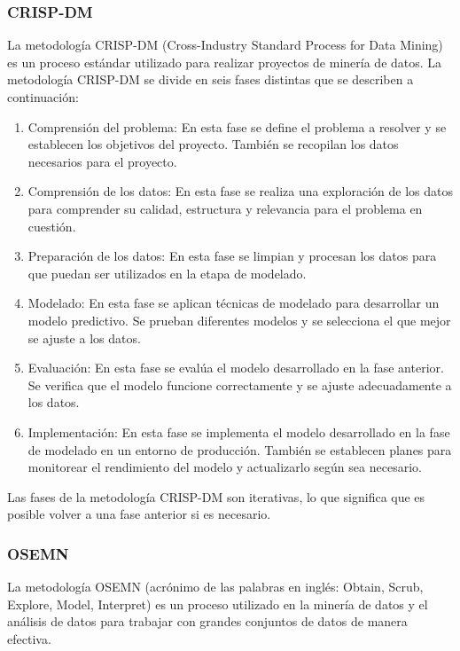 \subsubsection{CRISP-DM}
La metodología CRISP-DM (Cross-Industry Standard Process for Data Mining) es un proceso estándar utilizado para realizar proyectos de minería de datos. La metodología CRISP-DM se divide en seis fases distintas que se describen a continuación:

\begin{enumerate}
    \item Comprensión del problema: En esta fase se define el problema a resolver y se establecen los objetivos del proyecto. También se recopilan los datos necesarios para el proyecto.
    \item Comprensión de los datos: En esta fase se realiza una exploración de los datos para comprender su calidad, estructura y relevancia para el problema en cuestión.
    \item Preparación de los datos: En esta fase se limpian y procesan los datos para que puedan ser utilizados en la etapa de modelado.
    \item Modelado: En esta fase se aplican técnicas de modelado para desarrollar un modelo predictivo. Se prueban diferentes modelos y se selecciona el que mejor se ajuste a los datos.
    \item Evaluación: En esta fase se evalúa el modelo desarrollado en la fase anterior. Se verifica que el modelo funcione correctamente y se ajuste adecuadamente a los datos.
    \item Implementación: En esta fase se implementa el modelo desarrollado en la fase de modelado en un entorno de producción. También se establecen planes para monitorear el rendimiento del modelo y actualizarlo según sea necesario.
\end{enumerate}

Las fases de la metodología CRISP-DM son iterativas, lo que significa que es posible volver a una fase anterior si es necesario.

\subsubsection{OSEMN}

La metodología OSEMN (acrónimo de las palabras en inglés: Obtain, Scrub, Explore, Model, Interpret) es un proceso utilizado en la minería de datos y el análisis de datos para trabajar con grandes conjuntos de datos de manera efectiva. 

